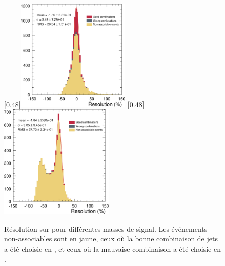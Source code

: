 \begin{figure}[tbp] \centering
    [0.48\textwidth]{\includegraphics[width=0.48\textwidth]{chapitre7/figs/mtt_resolution_zprime_750_narrow.pdf}} \hfill
    [0.48\textwidth]{\includegraphics[width=0.48\textwidth]{chapitre7/figs/mtt_resolution_zprime_2000_narrow.pdf}}
    \caption{Résolution sur \mtt pour différentes masses de signal. Les événements non-associables sont en jaune, ceux où la bonne combinaison de jets a été choisie en \rouge, et ceux où la mauvaise combinaison a été choisie en \gris.}
    \label{fig:mtt_reso_zprime}
\end{figure}

